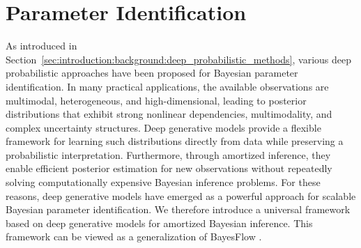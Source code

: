 \section{Parameter Identification}
\label{sec:methods:parameter_identification}

As introduced in Section~\ref{sec:introduction:background:deep_probabilistic_methods}, various deep probabilistic approaches have been proposed for Bayesian parameter identification. In many practical applications, the available observations are multimodal, heterogeneous, and high-dimensional, leading to posterior distributions that exhibit strong nonlinear dependencies, multimodality, and complex uncertainty structures. Deep generative models provide a flexible framework for learning such distributions directly from data while preserving a probabilistic interpretation. Furthermore, through amortized inference, they enable efficient posterior estimation for new observations without repeatedly solving computationally expensive Bayesian inference problems. For these reasons, deep generative models have emerged as a powerful approach for scalable Bayesian parameter identification. We therefore introduce a universal framework based on deep generative models for amortized Bayesian inference. This framework can be viewed as a generalization of BayesFlow \citep{radev2020bayesflow}.

